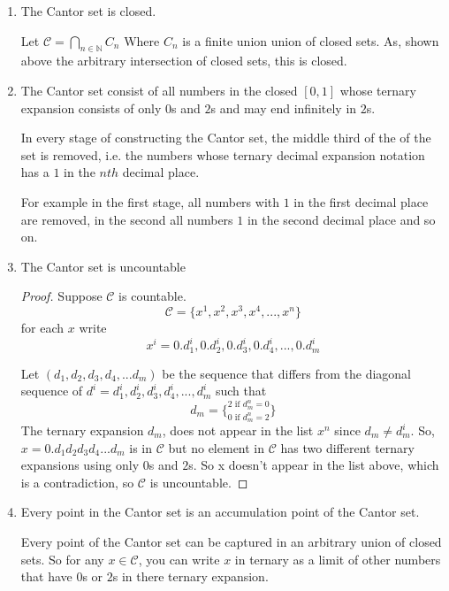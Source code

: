 \documentclass{tufte-book}
\theoremstyle{mytheoremstyle}
\theoremstyle{mylemstyle}
\theoremstyle{mydefstyle}
\begin{document}
\begin{enumerate}

\item The Cantor set is closed.

Let $\mathcal{C} = \bigcap\limits_{n \in \mathbb{N}}C_n$ Where $C_n$ is a finite union union of closed sets.  As, shown above the arbitrary intersection of closed sets, this is closed.

\item The Cantor set consist of all  numbers in the closed $[0,1]$ whose ternary expansion consists of only $0$s and $2$s and may end infinitely in $2$s.

In every stage of constructing the Cantor set, the middle third of the of the set is removed, i.e. the numbers whose ternary decimal expansion notation has a $1$ in the $nth$ decimal place.

For example in the first stage, all numbers with $1$ in the first decimal place are removed, in the second all numbers $1$ in the second decimal place and so on.

\item The Cantor set is uncountable

\begin{proof}
Suppose $\mathcal{C}$ is countable.
\[\mathcal{C} = \{x^1, x^2, x^3, x^4, ..., x^n\}\]
for each $x$ write
\[x^i = 0.d_1^i,0.d_2^i,0.d_3^i,0.d_4^i,...,0.d_m^i \]

Let $(d_1, d_2, d_3, d_4,...d_m)$ be the sequence that differs from the diagonal sequence of $d^i= d_1^i, d_2^i, d_3^i, d_4^i,...,d_m^i$ such that
\[d_m = \{_{0 \text{ if } d^n_m = 2}^{2 \text{ if } d^n_m = 0} \}\]
The ternary expansion $d_m$, does not appear in the list $x^n$ since $d_m \neq d_m^i$.  So, $x=0.d_1d_2d_3d_4...d_m$ is in $\mathcal{C}$ but no element in $\mathcal{C}$ has two different ternary expansions using only $0$s and $2$s. So x doesn't appear in the list above, which is a contradiction, so $\mathcal{C}$ is uncountable.

\end{proof}


\item Every point in the Cantor set is an accumulation point of the Cantor set.

Every point of the Cantor set can be captured in an arbitrary union of closed sets.  So for any $x \in \mathcal{C}$, you can write $x$ in ternary as a limit of other numbers that have $0$s or $2$s in there ternary expansion. 


\end{enumerate}
\end{document}
